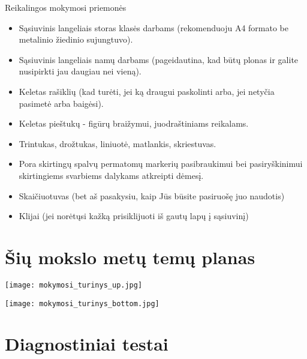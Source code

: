 \begin{frame}{Reikalingos mokymosi priemonės}{\secname}
\begin{itemize}[label=\textbullet]
\item<2-> Sąsiuvinis langeliais storas klasės darbams (rekomenduoju A4 formato be metalinio žiedinio sujungtuvo).
\item<3-> Sąsiuvinis langeliais namų darbams (pageidautina, kad būtų plonas ir galite nusipirkti jau daugiau nei vieną).
\item<4-> Keletas rašiklių (kad turėti, jei ką draugui paskolinti arba, jei netyčia pasimetė arba baigėsi).
\item<5-> Keletas pieštukų - figūrų braižymui, juodraštiniams reikalams.
\item<6-> Trintukas, drožtukas, liniuotė, matlankis, skriestuvas.
\item<7-> Pora skirtingų spalvų permatomų markerių pasibraukimui bei pasiryškinimui skirtingiems svarbiems dalykams atkreipti dėmesį.
\item<8-> Skaičiuotuvas (bet aš pasakysiu, kaip Jūs būsite pasiruošę juo naudotis)
\item<9-> Klijai (jei norėtųsi kažką prisiklijuoti iš gautų lapų į sąsiuvinį)
\end{itemize}
\end{frame}


\section{Šių mokslo metų temų planas}


\begin{frame}
\centering
\begin{minipage}{0.48\textwidth}
\centering
\texttt{[image: mokymosi\_turinys\_up.jpg]}
\end{minipage}
\hfill
\begin{minipage}{0.48\textwidth}
\centering
\texttt{[image: mokymosi\_turinys\_bottom.jpg]}
\end{minipage}
\end{frame}


\section{Diagnostiniai testai}